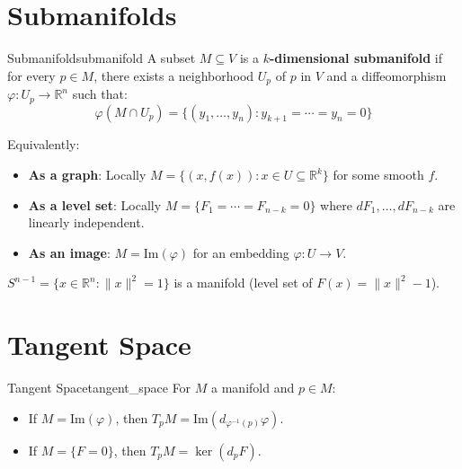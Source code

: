 \documentclass[11pt, letterpaper, openany]{book}
\begin{document}
\section{Submanifolds}

\begin{defn}{Submanifold}{submanifold}
A subset $M \subseteq V$ is a \textbf{$k$-dimensional submanifold} if for every $p \in M$, there exists a neighborhood $U_p$ of $p$ in $V$ and a diffeomorphism $\varphi: U_p \to \mathbb{R}^n$ such that:
\[
\varphi(M \cap U_p) = \{(y_1, \ldots, y_n) : y_{k+1} = \cdots = y_n = 0\}
\]
\end{defn}

Equivalently:
\begin{itemize}
    \item \textbf{As a graph}: Locally $M = \{(x, f(x)) : x \in U \subseteq \mathbb{R}^k\}$ for some smooth $f$.
    \item \textbf{As a level set}: Locally $M = \{F_1 = \cdots = F_{n-k} = 0\}$ where $dF_1, \ldots, dF_{n-k}$ are linearly independent.
    \item \textbf{As an image}: $M = \text{Im}(\varphi)$ for an embedding $\varphi: U \to V$.
\end{itemize}

\begin{example}
$S^{n-1} = \{x \in \mathbb{R}^n : \|x\|^2 = 1\}$ is a manifold (level set of $F(x) = \|x\|^2 - 1$).
\end{example}

\section{Tangent Space}

\begin{defn}{Tangent Space}{tangent_space}
For $M$ a manifold and $p \in M$:
\begin{itemize}
    \item If $M = \text{Im}(\varphi)$, then $T_p M = \text{Im}(d_{\varphi^{-1}(p)} \varphi)$.
    \item If $M = \{F = 0\}$, then $T_p M = \ker(d_p F)$.
\end{itemize}
\end{defn}
\end{document}
